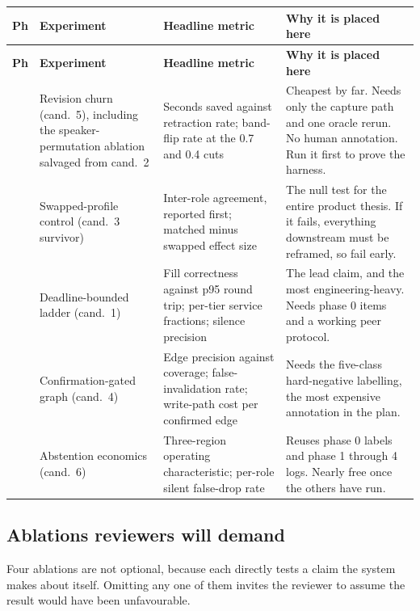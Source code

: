 {\footnotesize
\begin{longtable}{@{}p{0.55cm}p{4.5cm}p{4.6cm}p{4.9cm}@{}}
\toprule
\textbf{Ph} & \textbf{Experiment} & \textbf{Headline metric} & \textbf{Why it is placed here} \\
\midrule
\endfirsthead
\toprule
\textbf{Ph} & \textbf{Experiment} & \textbf{Headline metric} & \textbf{Why it is placed here} \\
\midrule
\endhead
\bottomrule
\endfoot
1 & Revision churn (cand.\ 5), including the speaker-permutation ablation salvaged from cand.\ 2 & Seconds saved against retraction rate; band-flip rate at the 0.7 and 0.4 cuts & Cheapest by far. Needs only the capture path and one oracle rerun. No human annotation. Run it first to prove the harness. \\
\addlinespace
2 & Swapped-profile control (cand.\ 3 survivor) & Inter-role agreement, reported first; matched minus swapped effect size & The null test for the entire product thesis. If it fails, everything downstream must be reframed, so fail early. \\
\addlinespace
3 & Deadline-bounded ladder (cand.\ 1) & Fill correctness against p95 round trip; per-tier service fractions; silence precision & The lead claim, and the most engineering-heavy. Needs phase 0 items and a working peer protocol. \\
\addlinespace
4 & Confirmation-gated graph (cand.\ 4) & Edge precision against coverage; false-invalidation rate; write-path cost per confirmed edge & Needs the five-class hard-negative labelling, the most expensive annotation in the plan. \\
\addlinespace
5 & Abstention economics (cand.\ 6) & Three-region operating characteristic; per-role silent false-drop rate & Reuses phase 0 labels and phase 1 through 4 logs. Nearly free once the others have run. \\
\end{longtable}}

\subsection{Ablations reviewers will demand}

Four ablations are not optional, because each directly tests a claim the
system makes about itself. Omitting any one of them invites the reviewer to
assume the result would have been unfavourable.

